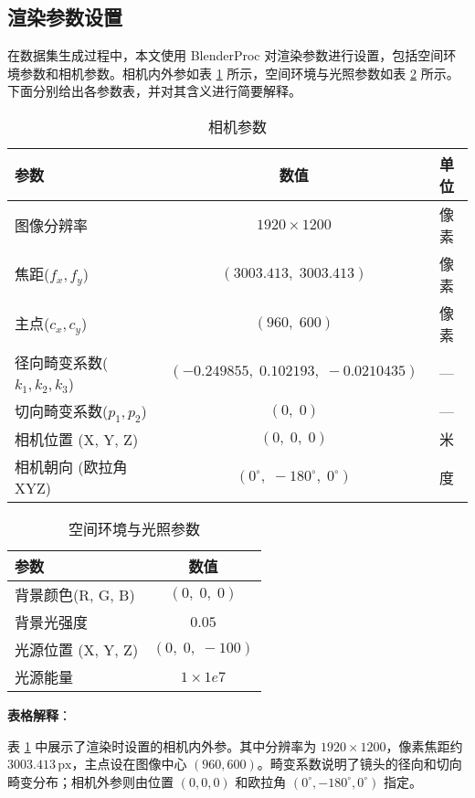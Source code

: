 \subsection{渲染参数设置}
在数据集生成过程中，本文使用 BlenderProc 对渲染参数进行设置，包括空间环境参数和相机参数。相机内外参如表 \ref{tab:camera-param} 所示，空间环境与光照参数如表 \ref{tab:env-param} 所示。下面分别给出各参数表，并对其含义进行简要解释。
\begin{table}[hbt]\centering
	\caption{相机参数}
	\label{tab:camera-param}
	\begin{tabular}{lcc}
		\toprule
		参数 & 数值 & 单位 \\
		\midrule
		图像分辨率 
		& $1920 \times 1200$ 
		& 像素 \\
		焦距($f_x, f_y$) 
		& $(3003.413,\;3003.413)$
		& 像素 \\
		主点($c_x, c_y$) 
		& $(960,\;600)$ 
		& 像素 \\
		径向畸变系数($k_1, k_2, k_3$) 
		& $(-0.249855,\;0.102193,\;-0.0210435)$ 
		& — \\
		切向畸变系数($p_1, p_2$) 
		& $(0,\;0)$ 
		& — \\
		相机位置 (X, Y, Z) 
		& $(0,\;0,\;0)$ 
		& 米 \\
		相机朝向 (欧拉角XYZ) 
		& $(0^\circ,\; -180^\circ,\; 0^\circ)$ 
		& 度 \\
		\bottomrule
	\end{tabular}
\end{table}
\begin{table}[hbt]\centering
	\caption{空间环境与光照参数}
	\label{tab:env-param}
	\begin{tabular}{lc}
		\toprule
		参数 & 数值 \\
		\midrule
		背景颜色(R, G, B) 
		& $(0,\;0,\;0)$ \\
		背景光强度 
		& $0.05$ \\
		光源位置 (X, Y, Z)
		& $(0,\;0,\;-100)$ \\
		光源能量 
		& $1 \times 1e7$ \\
		\bottomrule
	\end{tabular}
\end{table}
\noindent
\textbf{表格解释}：

表 \ref{tab:camera-param} 中展示了渲染时设置的相机内外参。其中分辨率为 $1920 \times 1200$，像素焦距约 $3003.413\,\mathrm{px}$，主点设在图像中心 $(960, 600)$。畸变系数说明了镜头的径向和切向畸变分布；相机外参则由位置 $(0,0,0)$ 和欧拉角 $(0^\circ,-180^\circ,0^\circ)$ 指定。

